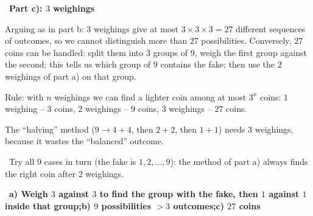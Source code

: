 \documentclass[11pt]{article}
\providecommand{\AnsWord}{Đáp số}
\newcommand{\ans}[1]{\par\smallskip{\bfseries\color{tmGreen!88!black}\AnsWord:}\ {\bfseries\color{AnsRed}#1}\par}
\newcommand{\step}[2]{\par\smallskip\noindent{\bfseries\color{tmBlue!85!black}\StepWord~#1.}\ {\bfseries #2}\par\nopagebreak}
\newcommand{\verify}[1]{\par\smallskip\noindent{\bfseries\color{tmGreen!80!black}\faCheckCircle\ \CheckWord}\ #1\par}
\def\AnsWord{Answer}
\def\StepWord{Step}
\def\CheckWord{Check:}
\begin{document}
{\step{4}{Part c): $3$ weighings}
Arguing as in part b: $3$ weighings give at most $3\times 3\times 3 = 27$ different sequences of outcomes, so we cannot distinguish more
than $27$ possibilities. Conversely, $27$ coins can be handled: split them into $3$ groups of $9$, weigh the first group against the
second; this tells us which group of $9$ contains the fake; then use the $2$ weighings of part a) on that group.
\begin{tipbox}Rule: with $n$ weighings we can find a lighter coin among at most $3^n$ coins: $1$ weighing -- $3$ coins, $2$ weighings --
$9$ coins, $3$ weighings -- $27$ coins.\end{tipbox}
\begin{warnbox}The ``halving'' method ($9 \to 4 + 4$, then $2 + 2$, then $1 + 1$) needs $3$ weighings, because it wastes the
``balanced'' outcome.\end{warnbox}
\verify{Try all $9$ cases in turn (the fake is $1, 2, \dots, 9$): the method of part a) always finds the right coin after $2$ weighings.}
\ans{a) Weigh $3$ against $3$ to find the group with the fake, then $1$ against $1$ inside that group;\quad b) $9$ possibilities $> 3$
outcomes;\quad c) $27$ coins}
}

\end{document}
